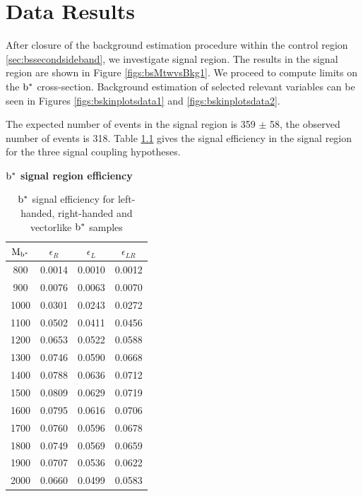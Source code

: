 \chapter{Data Results}
After closure of the background estimation procedure within the control region \ref{sec:bssecondsideband}, we investigate signal region.  
The results in the signal region are shown in Figure \ref{figs:bsMtwvsBkg1}.  We proceed to compute 
limits on the $\mathrm{b}^{*}$ cross-section.  Background estimation of selected relevant variables can be seen in 
Figures \ref{figs:bskinplotsdata1} and \ref{figs:bskinplotsdata2}.

The expected number of events in the signal region is 359 $\pm$ 58, the observed number of events is 318.  Table \ref{table:bssigeff} gives the signal efficiency in the signal region for 
the three signal coupling hypotheses.

\begin{table}
\begin{center}
\bf{$\mathrm{b}^{*}$ signal region efficiency}\\
\begin{tabular}{|c||c|c|c|}
\hline
\bf{$\mathrm{M_{\mathrm{b}^{*}}}$} & \bf{$\epsilon_{R}$}  & \bf{$\epsilon_{L}$} & \bf{$\epsilon_{LR}$} \\
\hline
800 & 0.0014 & 0.0010 & 0.0012\\
\hline
900 & 0.0076 & 0.0063 & 0.0070\\
\hline
1000 & 0.0301 & 0.0243 & 0.0272\\
\hline
1100 & 0.0502 & 0.0411 & 0.0456\\
\hline
1200 & 0.0653 & 0.0522 & 0.0588\\
\hline
1300 & 0.0746 & 0.0590 & 0.0668\\
\hline
1400 & 0.0788 & 0.0636 & 0.0712\\
\hline
1500 & 0.0809 & 0.0629 & 0.0719\\
\hline
1600 & 0.0795 & 0.0616 & 0.0706\\
\hline
1700 & 0.0760 & 0.0596 & 0.0678\\
\hline
1800 & 0.0749 & 0.0569 & 0.0659\\
\hline
1900 & 0.0707 & 0.0536 & 0.0622\\
\hline
2000 & 0.0660 & 0.0499 & 0.0583\\
\hline
\end{tabular}
\end{center}
\caption{$\mathrm{b}^{*}$ signal efficiency for left-handed, right-handed and vectorlike $\mathrm{b}^{*}$ samples}
\label{table:bssigeff}
\end{table}





